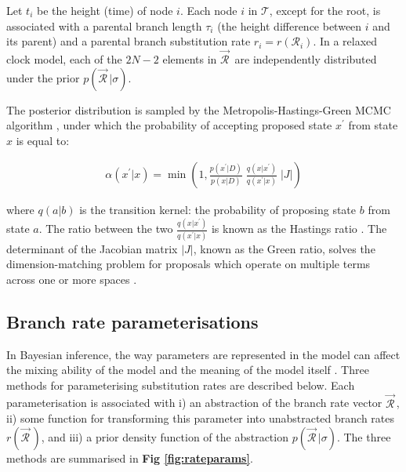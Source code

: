 \documentclass[10pt,letterpaper]{article}
\begin{document}
Let $t_i$ be the height (time) of node $i$.
Each node $i$ in $\mathcal{T}$, except for the root, is associated with a parental branch length $\tau_i$ (the height difference between $i$ and its parent)  and a parental branch substitution rate $r_i = r(\mathcal{R}_i)$. 
In a relaxed clock model, each of the $2N-2$ elements in $\vec{\mathcal{R}}^{\,}$ are independently distributed under the prior $p(\vec{\mathcal{R}}^{\,} | \sigma)$.



The posterior distribution is sampled by the Metropolis-Hastings-Green MCMC algorithm \cite{metropolis53, hastings70, green1995reversible},
under which the probability of accepting proposed state $x^\prime$ from state $x$ is equal to:

\begin{eqnarray}
\label{eq:MCMC}
\alpha(x^\prime|x) =  \min\left( 1, \frac{p(x^\prime|D)}{p(x|D)} \; \frac{q(x|x^\prime)}{q(x^\prime|x)} \; |J| \right)
\end{eqnarray}

\noindent
where $q(a|b)$ is the transition kernel: the probability of proposing state $b$ from state $a$.
The ratio between the two $\frac{q(x|x^\prime)}{q(x^\prime|x)}$ is known as the Hastings ratio \cite{hastings70}.
The determinant of the Jacobian matrix $|J|$, known as the Green ratio, solves the dimension-matching problem for proposals which operate on multiple terms across one or more spaces \cite{green1995reversible, geyer2003metropolis}. 




\clearpage
\subsection*{Branch rate parameterisations}
\label{sect:rateparams}

In Bayesian inference, the way parameters are represented in the model can affect the mixing ability of the model and the meaning of the model itself \cite{gelman2004parameterization}. Three methods for parameterising substitution rates are described below.
 Each parameterisation is associated with i) an abstraction of the branch rate vector $\vec{\mathcal{R}}^{\,}$, ii) some function for transforming this parameter into unabstracted branch rates $r(\vec{\mathcal{R}}^{\,})$, and iii) a prior density function of the abstraction $p(\vec{\mathcal{R}}^{\,} | \sigma) $. 
 The three methods are summarised in \textbf{Fig \ref{fig:rateparams}}.
\end{document}
